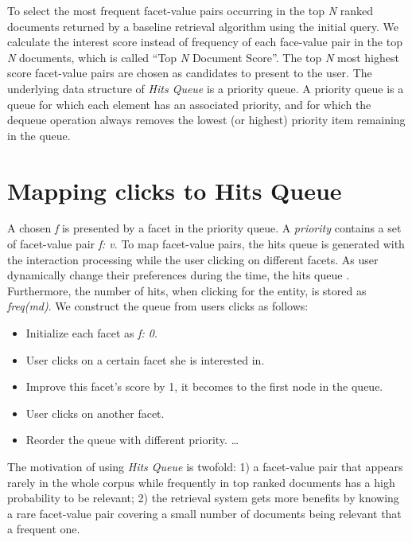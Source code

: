 To select the most frequent facet-value pairs occurring in the top {\it N} ranked documents returned by a baseline retrieval algorithm using the initial query. We calculate the interest score instead of frequency of each face-value pair in the top {\it N} documents, which is called ``Top {\it N} Document Score''. The top {\it N} most highest score facet-value pairs are chosen as candidates to present to the user. The underlying data structure of {\it Hits Queue} is a priority queue. A priority queue is a queue for which each element has an associated priority, and for which the dequeue operation always removes the lowest (or highest) priority item remaining in the queue. 

\section{Mapping clicks to Hits Queue}

A chosen {\it f}  is presented by a facet in the priority queue. A {\it priority} contains a set of facet-value pair {\it f: v}. To map facet-value pairs, the hits queue is generated with the interaction processing while the user clicking on different facets. As user dynamically change their preferences during the time, the hits queue . Furthermore, the number of hits, when clicking for the entity, is stored as {\it freq(md)}. We construct the queue from users clicks as follows:

\begin{itemize}
    \item Initialize each facet as {\it {f: 0}}.
    \item User clicks on a certain facet she is interested in.
    \item Improve this facet's score by 1, it becomes to the first node in the queue.
    \item User clicks on another facet.
    \item Reorder the queue with different priority. \ldots
\end{itemize}

The motivation of using {\it Hits Queue} is twofold: 1) a facet-value pair that appears rarely in the whole corpus while frequently in top ranked documents has a high probability to be relevant; 2) the retrieval system gets more benefits by knowing a rare facet-value pair covering a small number of documents being relevant that a frequent one.
